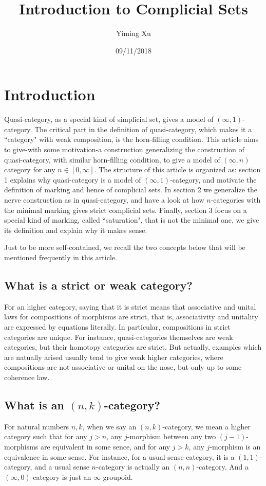 \documentclass[11pt]{article}
\title{Introduction to Complicial Sets}
\author{Yiming Xu}
\date{09/11/2018}
\begin{document}
\maketitle
\section{Introduction}
Quasi-category, as a special kind of simplicial set, gives a model of $(\infty,1)$-category. The critical part in the definition of quasi-category, which makes it a ``category" with weak composition, is the horn-filling condition. This article aims to give-with some motivation-a construction generalizing the construction of quasi-category, with similar horn-filling condition, to give a model of $(\infty,n)$ category for any $n\in [0,\infty]$. The structure of this article is organized as: section 1 explains why quasi-category is a model of $(\infty,1)$-category, and motivate the definition of marking and hence of complicial sets. In section 2 we generalize the nerve construction as in quasi-category, and have a look at how $n$-categories with the minimal marking gives strict complicial sets. Finally, section 3 focus on a special kind of marking, called ``saturation", that is not the minimal one, we give its definition and explain why it makes sense.

Just to be more self-contained, we recall the two concepts below that will be mentioned frequently in this article.

\subsection{What is a strict or weak category?}
For an higher category, saying that it is strict means that associative and unital laws for compositions of morphisms are strict, that is, associativity and unitality are expressed by equations literally. In particular, compositions in strict categories are unique. For instance, quasi-categories themselves are weak categories, but their homotopy categories are strict. But actually, examples which are natually arised usually tend to give weak higher categories, where compositions are not associative or unital on the nose, but only up to some coherence law.

\subsection{What is an $(n,k)$-category?}

For natural numbers $n,k$, when we say an $(n,k)$-category, we mean a higher category such that for any $j>n$, any $j$-morphism between any two $(j-1)$-morphisms are equivalent in some sence, and for any $j>k$, any $j$-morphism is an equivalence in some sense. For instance, for a usual-sense category, it is a $(1,1)$-category, and a usual sense $n$-category is actually an $(n,n)$-category. And a $(\infty,0)$-category is just an $\infty$-groupoid.
\end{document}
